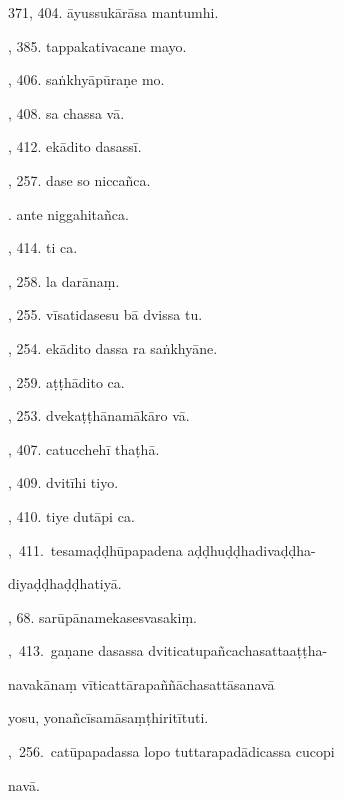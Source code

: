 371, 404. āyussukārāsa mantumhi.\hfill \pageref{sut:371}\par {}, 385. tappakativacane mayo.\hfill \pageref{sut:372}\par {}, 406. saṅkhyāpūraṇe mo.\hfill \pageref{sut:373}\par {}, 408. sa chassa vā.\hfill \pageref{sut:374}\par {}, 412. ekādito dasassī.\hfill \pageref{sut:375}\par {}, 257. dase so niccañca.\hfill \pageref{sut:376}\par {}. ante niggahitañca.\hfill \pageref{sut:377}\par {}, 414. ti ca.\hfill \pageref{sut:378}\par {}, 258. la darānaṃ.\hfill \pageref{sut:379}\par {}, 255. vīsatidasesu bā dvissa tu.\hfill \pageref{sut:380}\par {}, 254. ekādito dassa ra saṅkhyāne.\hfill \pageref{sut:381}\par {}, 259. aṭṭhādito ca.\hfill \pageref{sut:382}\par {}, 253. dvekaṭṭhānamākāro vā.\hfill \pageref{sut:383}\par {}, 407. catucchehī thaṭhā.\hfill \pageref{sut:384}\par {}, 409. dvitīhi tiyo.\hfill \pageref{sut:385}\par {}, 410. tiye dutāpi ca.\hfill \pageref{sut:386}\par {},~411.~tesamaḍḍhūpapadena aḍḍhuḍḍhadivaḍḍha-\par \noindent
\hspace{15mm} diyaḍḍhaḍḍhatiyā.\hfill \pageref{sut:387}\par {}, 68. sarūpānamekasesvasakiṃ.\hfill \pageref{sut:388}\par {},~413.~gaṇane dasassa dviticatupañcachasattaaṭṭha-\par \noindent
\hspace{15mm} navakānaṃ vīticattārapaññāchasattāsanavā\par \noindent
\hspace{15mm} yosu, yonañcīsamāsaṃṭhiritītuti.\hfill \pageref{sut:389}\par {},~256.~catūpapadassa lopo tuttarapadādicassa cucopi\par \noindent
\hspace{15mm} navā.\hfill \pageref{sut:390}\par \noindent
